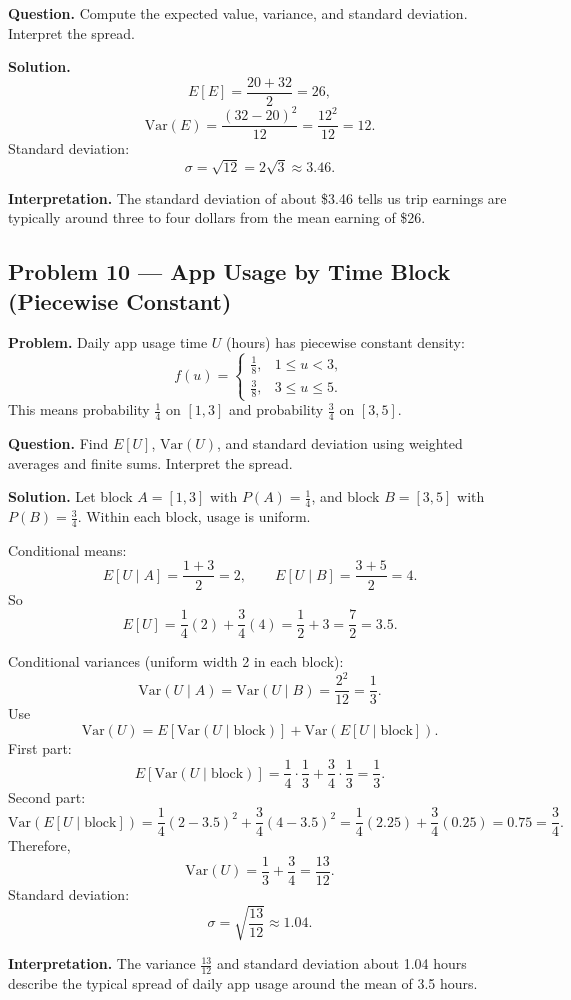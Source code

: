 \begin{ExamProblems}
\textbf{Question.} Compute the expected value, variance, and standard deviation. Interpret the spread.

\textbf{Solution.}
\[
E[E]=\frac{20+32}{2}=26,
\]
\[
\mathrm{Var}(E)=\frac{(32-20)^2}{12}=\frac{12^2}{12}=12.
\]
Standard deviation:
\[
\sigma=\sqrt{12}=2\sqrt{3}\approx 3.46.
\]

\textbf{Interpretation.}
The standard deviation of about \$3.46 tells us trip earnings are typically around three to four dollars from the mean earning of \$26.


\item
\subsection*{Problem 10 — App Usage by Time Block (Piecewise Constant)}

\textbf{Problem.}
Daily app usage time \(U\) (hours) has piecewise constant density:
\[
f(u)=\begin{cases}
\frac{1}{8}, & 1\le u<3,\\[4pt]
\frac{3}{8}, & 3\le u\le 5.
\end{cases}
\]
This means probability \(\frac{1}{4}\) on \([1,3]\) and probability \(\frac{3}{4}\) on \([3,5]\).

\textbf{Question.} Find \(E[U]\), \(\mathrm{Var}(U)\), and standard deviation using weighted averages and finite sums. Interpret the spread.

\textbf{Solution.}
Let block \(A=[1,3]\) with \(P(A)=\frac{1}{4}\), and block \(B=[3,5]\) with \(P(B)=\frac{3}{4}\).
Within each block, usage is uniform.

Conditional means:
\[
E[U\mid A]=\frac{1+3}{2}=2,
\qquad
E[U\mid B]=\frac{3+5}{2}=4.
\]
So
\[
E[U]=\frac{1}{4}(2)+\frac{3}{4}(4)=\frac{1}{2}+3=\frac{7}{2}=3.5.
\]

Conditional variances (uniform width 2 in each block):
\[
\mathrm{Var}(U\mid A)=\mathrm{Var}(U\mid B)=\frac{2^2}{12}=\frac{1}{3}.
\]
Use
\[
\mathrm{Var}(U)=E[\mathrm{Var}(U\mid \text{block})]+\mathrm{Var}(E[U\mid \text{block}]).
\]
First part:
\[
E[\mathrm{Var}(U\mid \text{block})]=\frac{1}{4}\cdot\frac{1}{3}+\frac{3}{4}\cdot\frac{1}{3}=\frac{1}{3}.
\]
Second part:
\[
\mathrm{Var}(E[U\mid \text{block}])=
\frac{1}{4}(2-3.5)^2+\frac{3}{4}(4-3.5)^2
=\frac{1}{4}(2.25)+\frac{3}{4}(0.25)=0.75=\frac{3}{4}.
\]
Therefore,
\[
\mathrm{Var}(U)=\frac{1}{3}+\frac{3}{4}=\frac{13}{12}.
\]
Standard deviation:
\[
\sigma=\sqrt{\frac{13}{12}}\approx 1.04.
\]

\textbf{Interpretation.}
The variance \(\frac{13}{12}\) and standard deviation about 1.04 hours describe the typical spread of daily app usage around the mean of 3.5 hours.

\end{ExamProblems}

